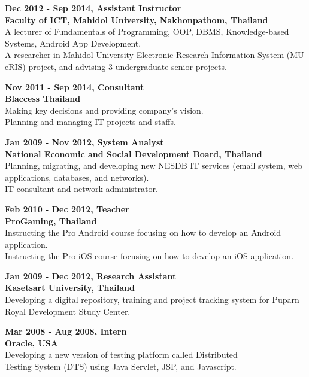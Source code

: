\documentclass[a4paper,12pt,final]{memoir}
\newcommand{\SmallSep}{\vspace{0.5em}}
\newcommand{\CVItem}[1]
	{\textbf{\color{RoyalBlue} #1}}
\begin{document}
\clearpage
\framebreak
\framebreak

\CVItem{Dec 2012 - Sep 2014, Assistant Instructor}\\
\textbf{Faculty of ICT, Mahidol University, Nakhonpathom, Thailand}\\
A lecturer of Fundamentals of Programming, OOP, DBMS, Knowledge-based Systems, Android App Development.\\ 
A researcher in Mahidol University Electronic Research Information System (MU eRIS) project, and advising 3 undergraduate senior projects.

\SmallSep

\CVItem{Nov 2011 - Sep 2014, Consultant}\\
\textbf{Blaccess Thailand}\\
Making key decisions and providing company's vision.\\
Planning and managing IT projects and staffs.

\SmallSep

\CVItem{Jan 2009 - Nov 2012, System Analyst}\\
\textbf{National Economic and Social Development Board, Thailand}\\
Planning, migrating, and developing new NESDB IT services (email system, web applications, databases, and networks).\\
IT consultant and network administrator.

\SmallSep

\CVItem{Feb 2010 - Dec 2012, Teacher}\\
\textbf{ProGaming, Thailand}\\
Instructing the Pro Android course focusing on how to develop an Android application.\\
Instructing the Pro iOS course focusing on how to develop an iOS application.

\SmallSep

\CVItem{Jan 2009 - Dec 2012, Research Assistant}\\
\textbf{Kasetsart University, Thailand}\\
Developing a digital repository, training and project tracking system for Puparn Royal Development Study Center.
\SmallSep

\CVItem{Mar 2008 - Aug 2008, Intern}\\
\textbf{Oracle, USA}\\
Developing a new version of testing platform called Distributed\\ 
Testing System (DTS) using Java Servlet, JSP, and Javascript.
\end{document}
